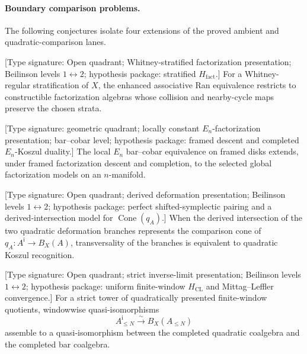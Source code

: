 \paragraph{Boundary comparison problems.}
The following conjectures isolate four extensions of the proved
ambient and quadratic-comparison lanes.

\begin{conjecture}
\label{conj:pi1-francis-gaitsgory}
\textup{[Type signature: Open quadrant; Whitney-stratified
factorization presentation; Beilinson levels
\(1\leftrightarrow2\); hypothesis package: stratified
\(H_{\mathrm{fact}}\).]}
For a Whitney-regular stratification of \(X\), the enhanced
associative Ran equivalence restricts to constructible
factorization algebras whose collision and nearby-cycle maps preserve
the chosen strata.
\end{conjecture}

\begin{conjecture}
\label{conj:pi2-en-bar-higher-dimension}
\textup{[Type signature: geometric quadrant; locally constant
\(E_n\)-factorization presentation; bar--cobar level; hypothesis
package: framed descent and completed \(E_n\)-Koszul duality.]}
The local \(E_n\) bar--cobar equivalence on framed disks extends,
under framed factorization descent and completion, to the selected
global factorization models on an \(n\)-manifold.
\end{conjecture}

\begin{conjecture}
\label{conj:pi3-lagrangian-koszul-converse}
\textup{[Type signature: Open quadrant; derived deformation
presentation; Beilinson levels \(1\leftrightarrow2\); hypothesis
package: perfect shifted-symplectic pairing and a derived-intersection
model for \(\operatorname{Cone}(q_A)\).]}
When the derived intersection of the two quadratic deformation
branches represents the comparison cone of
\(q_A\colon A^{\mathrm i}\to B_X(A)\), transversality of the branches
is equivalent to quadratic Koszul recognition.
\end{conjecture}

\begin{conjecture}
\label{conj:pi4-unbounded-rank}
\textup{[Type signature: Open quadrant; strict inverse-limit
presentation; Beilinson levels \(1\leftrightarrow2\); hypothesis
package: uniform finite-window \(H_{\mathrm{CL}}\) and
Mittag--Leffler convergence.]}
For a strict tower of quadratically presented finite-window quotients,
windowwise quasi-isomorphisms
\[
A_{\leq N}^{\mathrm i}\xrightarrow{\sim}B_X(A_{\leq N})
\]
assemble to a quasi-isomorphism between the completed quadratic
coalgebra and the completed bar coalgebra.
\end{conjecture}

